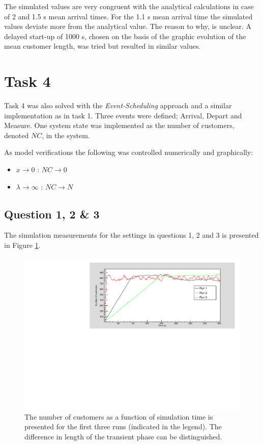 \documentclass[]{article}
\begin{document}
The simulated values are very congruent with the analytical calculations in case of 2 and 1.5 s mean arrival times.
For the 1.1 s mean arrival time the simulated values deviate more from the analytical value.
The reason to why, is unclear.
A delayed start-up of 1000 s, chosen on the basis of the graphic evolution of the mean customer length, was tried but resulted in similar values.

\section{Task 4}
Task 4 was also solved with the {\it Event-Scheduling} approach and a similar implementation as in task 1.
Three events were defined; Arrival, Depart and Measure.
One system state was implemented as the number of customers, denoted $NC$,  in the system.

As model verifications the following was controlled numerically and graphically:
\begin{itemize}
  \item $ x \rightarrow 0$ : $ NC \rightarrow 0$
  \item $\lambda \rightarrow \infty$ : $ NC \rightarrow N$
\end{itemize}

\subsection{Question 1, 2 \& 3}
The simulation measurements for the settings in questions 1, 2 and 3 is presented in Figure \ref{fig:task4}.

\begin{figure}[H]
  \centering
  \includegraphics[width=\textwidth]{task4a.pdf}
  \caption{The number of customers as a function of simulation time is presented for the first three runs (indicated in the legend). The difference in length of the transient phase can be distinguished. }
  \label{fig:task4}
\end{figure}
\end{document}
